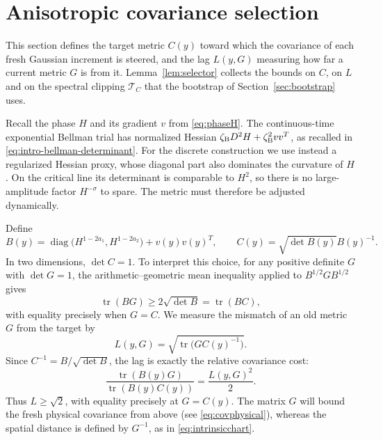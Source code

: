 \documentclass[11pt]{article}
\theoremstyle{definition}
\theoremstyle{remark}
\numberwithin{equation}{section}
\newcommand{\tr}{\operatorname{tr}}
\begin{document}
\section{Anisotropic covariance selection}\label{sec:selector}

This section defines the target metric $C(y)$ toward which the
covariance of each fresh Gaussian increment is steered, and the lag
$L(y,G)$ measuring how far a current metric $G$ is from it.
Lemma~\ref{lem:selector} collects the bounds on $C$, on $L$ and on
the spectral clipping $\mathcal T_C$ that the bootstrap of
Section~\ref{sec:bootstrap} uses.

Recall the phase $H$ and its gradient $v$ from
\eqref{eq:phaseH}.
The continuous-time exponential Bellman trial has normalized Hessian
$\zeta_{\rm B}D^2H+\zeta_{\rm B}^2vv^T$, as recalled in
\eqref{eq:intro-bellman-determinant}. For the discrete construction
we use instead a regularized Hessian proxy, whose diagonal
part also dominates the curvature of $H$. On the critical line its
determinant is comparable to $H^2$, so there is no large-amplitude
factor $H^{-\sigma}$ to spare. The metric must therefore be
adjusted dynamically.

Define
\begin{equation}\label{eq:B}
 B(y)=\operatorname{diag}\bigl(H^{1-2a_1},H^{1-2a_2}\bigr)+v(y)v(y)^T,
 \qquad C(y)=\sqrt{\det B(y)}B(y)^{-1}.
\end{equation}
In two dimensions, $\det C=1$. To interpret this choice, for any
positive definite $G$ with $\det G=1$, the arithmetic--geometric
mean inequality applied to $B^{1/2}GB^{1/2}$ gives
\[
 \tr(BG)\ge2\sqrt{\det B}=\tr(BC),
\]
with equality precisely when $G=C$. We measure the mismatch of an old
metric $G$ from the target by
\begin{equation}\label{eq:lag}
 L(y,G)=\sqrt{\tr\bigl(GC(y)^{-1}\bigr)}.
\end{equation}
Since $C^{-1}=B/\sqrt{\det B}$, the lag is exactly the relative
covariance cost:
\begin{equation}\label{eq:lag-cost}
 \frac{\tr(B(y)G)}{\tr(B(y)C(y))}=\frac{L(y,G)^2}{2}.
\end{equation}
Thus $L\ge\sqrt2$, with equality precisely at $G=C(y)$.
The matrix $G$ will bound the fresh physical covariance from above
(see \eqref{eq:covphysical}), whereas the spatial distance is defined
by $G^{-1}$, as in \eqref{eq:intrinsicchart}.
\end{document}
